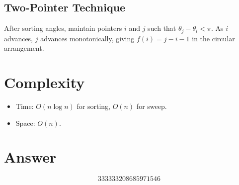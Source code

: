 \documentclass[12pt]{article}
\theoremstyle{definition}
\begin{document}
\subsection{Two-Pointer Technique}
After sorting angles, maintain pointers $i$ and $j$ such that $\theta_j - \theta_i < \pi$. As $i$ advances, $j$ advances monotonically, giving $f(i) = j - i - 1$ in the circular arrangement.

\section{Complexity}
\begin{itemize}
\item Time: $O(n \log n)$ for sorting, $O(n)$ for sweep.
\item Space: $O(n)$.
\end{itemize}

\section{Answer}

\[
\boxed{333333208685971546}
\]
\end{document}
